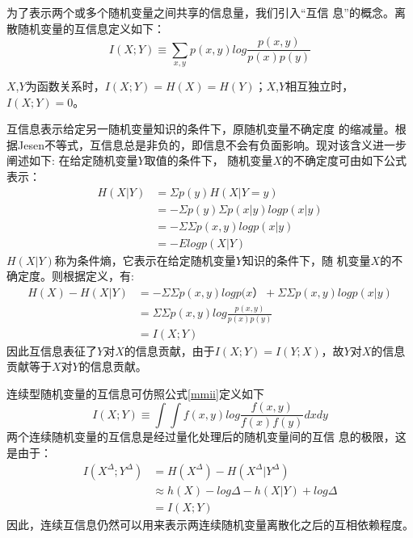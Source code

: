  
为了表示两个或多个随机变量之间共享的信息量，我们引入``互信
息''的概念。离散随机变量的互信息定义如下：
\begin{equation}
\label{mmii}
I(X;Y)\equiv\sum_{x,y}p(x,y)log\frac{p(x,y)}{p(x)p(y)}
\end{equation}


$X$,$Y$为函数关系时，$I(X;Y)=H(X)=H(Y)$；$X$,$Y$相互独立时，$I(X;Y)=0$。

互信息表示给定另一随机变量知识的条件下，原随机变量不确定度
的缩减量。根据Jesen不等式，互信息总是非负的，即信息不会有负面影响。现对该含义进一步阐述如下: 在给定随机变量$Y$取值的条件下，
随机变量$X$的不确定度可由如下公式表示：
\begin{equation}
\begin{split}
H(X|Y)&=\Sigma p(y)H(X|Y=y)\\
&=-\Sigma p(y) \Sigma p(x|y)logp(x|y)\\
&=-\Sigma \Sigma p(x,y)logp(x|y)\\
&=-Elogp(X|Y)
\end{split}
\end{equation}
$H(X|Y)$称为条件熵，它表示在给定随机变量$Y$知识的条件下，随
机变量$X$的不确定度。则根据定义，有:
\begin{equation}
\label{relation}
\begin{split}
H(X)-H(X|Y)&=-\Sigma \Sigma p(x,y)logp(x）+\Sigma \Sigma p
(x,y)logp(x|y)\\
&=\Sigma \Sigma p(x,y)log \frac{p(x,y)}{p(x)p(y)}\\
&=I(X;Y)
\end{split}
\end{equation}
因此互信息表征了$Y$对$X$的信息贡献，由于$I(X;Y)=I(Y;X)$，故$Y$对$X$的信息贡献等于$X$对$Y$的信息贡献。

连续型随机变量的互信息可仿照公式\ref{mmii}定义如下
\begin{equation}
\label{mmmii}
I(X;Y)\equiv\int \int f(x,y)log\frac{f(x,y)}{f(x)f(y)}dxdy
\end{equation}
两个连续随机变量的互信息是经过量化处理后的随机变量间的互信
息的极限，这是由于：
\begin{equation}
\begin{split}
I(X^{\Delta};Y^{\Delta})&=H(X^{\Delta})-H(X^{\Delta}|Y^
{\Delta})\\
						&\approx h
(X)-log\Delta-h(X|Y)+log\Delta\\
						&=I(X;Y) 
\end{split}
\end{equation}
因此，连续互信息仍然可以用来表示两连续随机变量离散化之后的互相依赖程度。

